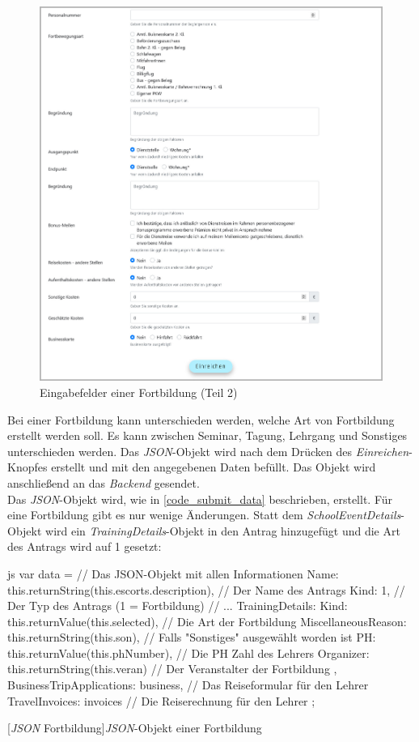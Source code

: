 \begin{figure}[H]
	\centering
	\includegraphics[width=1\linewidth]{images/rfoster_implementierung/workshop2}
	\caption[Fortbildungsinformationen eingeben (Teil 2)]{Eingabefelder einer Fortbildung (Teil 2)}
	\label{fig:workshop2}
\end{figure}
\newpage
Bei einer Fortbildung kann unterschieden werden, welche Art von Fortbildung erstellt werden soll. Es kann zwischen Seminar, Tagung, Lehrgang und Sonstiges unterschieden werden. Das \textit{JSON}-Objekt wird nach dem Drücken des \textit{Einreichen}-Knopfes erstellt und mit den angegebenen Daten befüllt. Das Objekt wird anschließend an das \textit{Backend} gesendet.\\

Das \textit{JSON}-Objekt wird, wie in \autoref{code_submit_data} beschrieben, erstellt. Für eine Fortbildung gibt es nur wenige Änderungen.
Statt dem \textit{SchoolEventDetails}-Objekt wird ein \textit{TrainingDetails}-Objekt in den Antrag hinzugefügt und die Art des Antrags wird auf 1 gesetzt:
\begin{code}{js}
var data = {		// Das JSON-Objekt mit allen Informationen
	Name: this.returnString(this.escorts.description),	// Der Name des Antrags
	Kind: 1,	// Der Typ des Antrags (1 = Fortbildung)
	// ...
	TrainingDetails: {
		Kind: this.returnValue(this.selected),	// Die Art der Fortbildung
		MiscellaneousReason: this.returnString(this.son),	// Falls "Sonstiges" ausgewählt worden ist
		PH: this.returnValue(this.phNumber),	// Die PH Zahl des Lehrers
		Organizer: this.returnString(this.veran)	// Der Veranstalter der Fortbildung
	},
	BusinessTripApplications: business,	// Das Reiseformular für den Lehrer
	TravelInvoices: invoices	// Die Reiserechnung für den Lehrer
};
\end{code}
[\textit{JSON} Fortbildung]{\textit{JSON}-Objekt einer Fortbildung}~\\
\newpage
